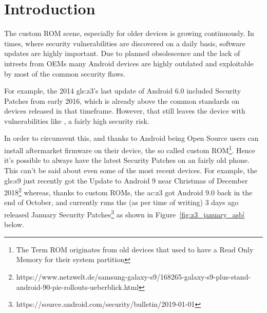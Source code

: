 
\section{Introduction}
\label{ch:Introduction}

The custom ROM scene, especially for older devices is growing continuously. In times, where security vulnerabilities are discovered on a daily basis, software updates are highly important. Due to planned obsolescence and the lack of intrests from OEMs many Android devices are highly outdated and exploitable by most of the common security flaws.

For example, the 2014 \gls{gls:z3}'s last update of Android 6.0 included Security Patches from early 2016, which is already above the common standards on devices released in that timeframe.
However, that still leaves the device with vulnerabilities like , a fairly high security risk.

In order to circumvent this, and thanks to Android being Open Source users can install aftermarket firmware on their device, the so called custom ROM\footnote{The Term ROM originates from old devices that used to have a Read Only Memory for their system partition}. Hence it's possible to always have the latest Security Patches on an fairly old phone. This can't be said about even some of the most recent devices. For example, the \gls{gls:s9} just recently got the Update to Android 9 near Christmas of December 2018\footnote{https://www.netzwelt.de/samsung-galaxy-s9/168265-galaxy-s9-plus-stand-android-90-pie-rollouts-ueberblick.html} whereas, thanks to custom ROMs, the \acrshort{ac:z3} got Android 9.0 back in the end of October, and currently runs the (as per time of writing) 3 days ago released January Security Patches\footnote{\label{jan_asb}https://source.android.com/security/bulletin/2019-01-01} as shown in Figure~\ref{fig:z3_january_asb} below.

\newpage

